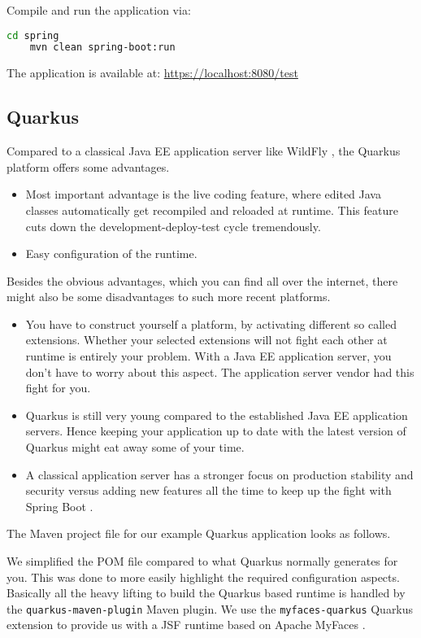 Compile and run the application via:
\begin{lstlisting}[language=bash]
	cd spring
	mvn clean spring-boot:run
\end{lstlisting}
The application is available at:
\url{https://localhost:8080/test}



\subsection{Quarkus}

Compared to a classical Java EE application server like WildFly \cite{WildFly}, the Quarkus \cite{quarkus} platform offers some advantages.
\begin{itemize}
	\item Most important advantage is the live coding feature, where edited Java classes automatically get recompiled and reloaded at runtime.
	This feature cuts down the development-deploy-test cycle tremendously.
	\item Easy configuration of the runtime.
\end{itemize}
Besides the obvious advantages, which you can find all over the internet, there might also be some disadvantages to such more recent platforms.
\begin{itemize}
	\item You have to construct yourself a platform, by activating different so called extensions.
	Whether your selected extensions will not fight each other at runtime is entirely your problem.
	With a Java EE application server, you don't have to worry about this aspect.
	The application server vendor had this fight for you.
	\item Quarkus is still very young compared to the established Java EE application servers.
	Hence keeping your application up to date with the latest version of Quarkus might eat away some of your time.
	\item A classical application server has a stronger focus on production stability and security versus adding new features all the time to keep up the fight with Spring Boot \cite{spring}.
\end{itemize}

The Maven project file for our example Quarkus application looks as follows.

We simplified the POM file compared to what Quarkus normally generates for you.
This was done to more easily highlight the required configuration aspects.
Basically all the heavy lifting to build the Quarkus based runtime is handled by the \texttt{quarkus-maven-plugin} Maven plugin.
We use the \texttt{myfaces-quarkus} Quarkus extension to provide us with a JSF runtime based on Apache MyFaces \cite{myfaces}.



